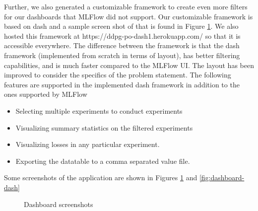 Further, we also generated a customizable framework to create even more filters for our dashboards that MLFlow did not support. Our customizable framework is based on dash \cite{dash_2022} and a sample screen shot of that is found in Figure \ref{fig:DashDashboard}. We also hosted this framework at https://ddpg-po-dash1.herokuapp.com/ so that it is accessible everywhere. The difference between the framework is that the dash framework (implemented from scratch in terms of layout), has better filtering capabilities, and is much faster compared to the MLFlow UI. The layout has been improved to consider the specifics of the problem statement.
The following features are supported in the implemented dash framework in addition to the ones supported by MLFlow

\begin{itemize}
    \item Selecting multiple experiments to conduct experiments
    \item Visualizing summary statistics on the filtered experiments
    \item Visualizing losses in any particular experiment.
    \item Exporting the datatable to a comma separated value file.
\end{itemize}
Some screenshots of the application are shown in Figures \ref{fig:DashDashboard} and \ref{fig:dashboard-dash}

 \begin{figure}[!tbp]
  \vfill
  \vfill
  \caption{ Dashboard screenshots}
  \label{fig:DashDashboard}
\end{figure}


